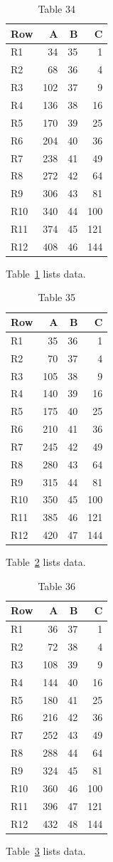 \documentclass[10pt]{article}
\begin{document}
\begin{table}[ht]\centering\caption{Table 34}\label{tab:34}\begin{tabular}{lrrr}\toprule Row&A&B&C\\\midrule
R1&34&35&1\\
R2&68&36&4\\
R3&102&37&9\\
R4&136&38&16\\
R5&170&39&25\\
R6&204&40&36\\
R7&238&41&49\\
R8&272&42&64\\
R9&306&43&81\\
R10&340&44&100\\
R11&374&45&121\\
R12&408&46&144\\
\bottomrule\end{tabular}\end{table} Table~\ref{tab:34} lists data.
\begin{table}[ht]\centering\caption{Table 35}\label{tab:35}\begin{tabular}{lrrr}\toprule Row&A&B&C\\\midrule
R1&35&36&1\\
R2&70&37&4\\
R3&105&38&9\\
R4&140&39&16\\
R5&175&40&25\\
R6&210&41&36\\
R7&245&42&49\\
R8&280&43&64\\
R9&315&44&81\\
R10&350&45&100\\
R11&385&46&121\\
R12&420&47&144\\
\bottomrule\end{tabular}\end{table} Table~\ref{tab:35} lists data.
\begin{table}[ht]\centering\caption{Table 36}\label{tab:36}\begin{tabular}{lrrr}\toprule Row&A&B&C\\\midrule
R1&36&37&1\\
R2&72&38&4\\
R3&108&39&9\\
R4&144&40&16\\
R5&180&41&25\\
R6&216&42&36\\
R7&252&43&49\\
R8&288&44&64\\
R9&324&45&81\\
R10&360&46&100\\
R11&396&47&121\\
R12&432&48&144\\
\bottomrule\end{tabular}\end{table}\clearpage Table~\ref{tab:36} lists data.
\end{document}
